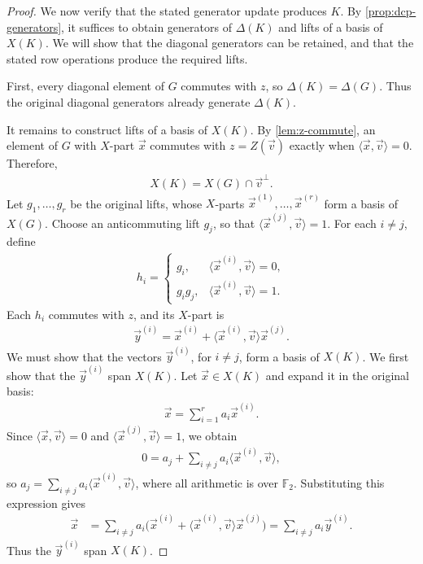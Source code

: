 \begin{proof}
    We now verify that the stated generator update produces $K$.
    By \cref{prop:dcp-generators}, it suffices to obtain generators of $\Delta(K)$ and lifts of a basis of $X(K)$.
    We will show that the diagonal generators can be retained, and that the stated row operations produce the required lifts.

    First, every diagonal element of $G$ commutes with $z$, so $\Delta(K)=\Delta(G)$.
    Thus the original diagonal generators already generate $\Delta(K)$.

    It remains to construct lifts of a basis of $X(K)$.
    By \cref{lem:z-commute}, an element of $G$ with $X$-part $\vec{x}$ commutes with $z=Z(\vec v)$ exactly when $\langle\vec{x},\vec v\rangle=0$.
    Therefore,
    \begin{align}
        X(K)=X(G)\cap\vec v^\perp.
    \end{align}
    Let $g_1,\ldots,g_r$ be the original lifts, whose $X$-parts $\vec{x}^{(1)},\ldots,\vec{x}^{(r)}$ form a basis of $X(G)$.
    Choose an anticommuting lift $g_j$, so that $\langle\vec{x}^{(j)},\vec v\rangle=1$.
    For each $i\neq j$, define
    \begin{align}
        h_i=
        \begin{cases}
            g_i, & \langle\vec{x}^{(i)},\vec v\rangle=0,\\
            g_i g_j, & \langle\vec{x}^{(i)},\vec v\rangle=1.
        \end{cases}
    \end{align}
    Each $h_i$ commutes with $z$, and its $X$-part is
    \begin{align}
        \vec{y}^{(i)}
        =\vec{x}^{(i)}+\langle\vec{x}^{(i)},\vec v\rangle\vec{x}^{(j)}.
    \end{align}
    We must show that the vectors $\vec{y}^{(i)}$, for $i\neq j$, form a basis of $X(K)$.
    We first show that the $\vec{y}^{(i)}$ span $X(K)$.
    Let $\vec{x}\in X(K)$ and expand it in the original basis:
    \begin{align}
        \vec{x}=\sum_{i=1}^r a_i\vec{x}^{(i)}.
    \end{align}
    Since $\langle\vec{x},\vec v\rangle=0$ and $\langle\vec{x}^{(j)},\vec v\rangle=1$, we obtain
    \begin{align}
        0=a_j+\sum_{i\neq j}a_i\langle\vec{x}^{(i)},\vec v\rangle,
    \end{align}
    so $a_j=\sum_{i\neq j}a_i\langle\vec{x}^{(i)},\vec v\rangle$, where all arithmetic is over $\mathbb F_2$.
    Substituting this expression gives
    \begin{align}
        \vec{x}
        &=\sum_{i\neq j}a_i
        \bigl(\vec{x}^{(i)}+\langle\vec{x}^{(i)},\vec v\rangle\vec{x}^{(j)}\bigr)
        =\sum_{i\neq j}a_i\vec{y}^{(i)}.
    \end{align}
    Thus the $\vec{y}^{(i)}$ span $X(K)$.


\end{proof}
